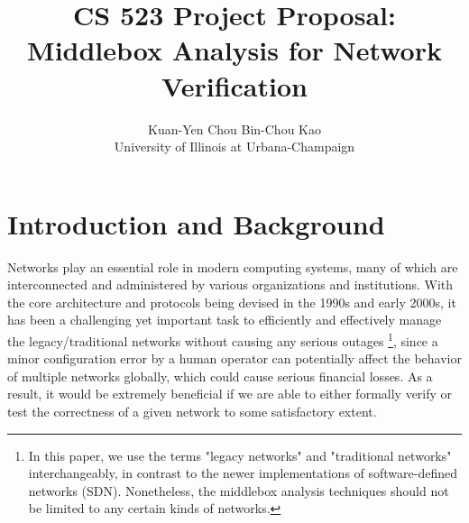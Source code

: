 \usepackage{filecontents}



\date{}

\title{\Large \bf CS 523 Project Proposal:\\
Middlebox Analysis for Network Verification}

\author{
{\rm Kuan-Yen Chou}
\qquad
{\rm Bin-Chou Kao}\\
University of Illinois at Urbana-Champaign
} %

\maketitle



\section{Introduction and Background}

Networks play an essential role in modern computing systems, many of which are
interconnected and administered by various organizations and institutions. With
the core architecture and protocols being devised in the 1990s and early 2000s,
it has been a challenging yet important task to efficiently and effectively
manage the legacy/traditional networks without causing any serious outages
\footnote{In this paper, we use the terms "legacy networks" and "traditional
networks" interchangeably, in contrast to the newer implementations of
software-defined networks (SDN). Nonetheless, the middlebox analysis techniques
should not be limited to any certain kinds of networks.},
since a minor configuration error by a human operator can potentially affect the
behavior of multiple networks globally, which could cause serious financial
losses. As a result, it would be extremely beneficial if we are able to either
formally verify or test the correctness of a given network to some satisfactory
extent.

